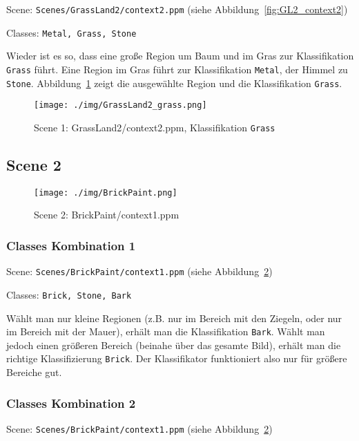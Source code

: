 Scene: \texttt{Scenes/GrassLand2/context2.ppm} (siehe Abbildung~\ref{fig:GL2_context2})

Classes: \texttt{Metal, Grass, Stone}

Wieder ist es so, dass eine große Region um Baum und im Gras zur Klassifikation \texttt{Grass} führt. Eine Region im Gras führt zur Klassifikation \texttt{Metal}, der Himmel zu \texttt{Stone}. Abbildung~\ref{fig:GL2_context2_grass} zeigt die ausgewählte Region und die Klassifikation \texttt{Grass}.

\begin{figure}[htb!]
 \centering
 \texttt{[image: ./img/GrassLand2\_grass.png]}
 \caption{Scene 1: GrassLand2/context2.ppm, Klassifikation \texttt{Grass}}
 \label{fig:GL2_context2_grass}
\end{figure}


\subsection{Scene 2}

\begin{figure}[htb!]
 \centering
 \texttt{[image: ./img/BrickPaint.png]}
 \caption{Scene 2: BrickPaint/context1.ppm}
 \label{fig:BP_context1}
\end{figure}


\subsubsection{Classes Kombination 1}

Scene: \texttt{Scenes/BrickPaint/context1.ppm} (siehe Abbildung~\ref{fig:BP_context1})

Classes: \texttt{Brick, Stone, Bark}

Wählt man nur kleine Regionen (z.B. nur im Bereich mit den Ziegeln, oder nur im Bereich mit der Mauer), erhält man die Klassifikation \texttt{Bark}. Wählt man jedoch einen größeren Bereich (beinahe über das gesamte Bild), erhält man die richtige Klassifizierung \texttt{Brick}. Der Klassifikator funktioniert also nur für größere Bereiche gut.


\subsubsection{Classes Kombination 2}

Scene: \texttt{Scenes/BrickPaint/context1.ppm} (siehe Abbildung~\ref{fig:BP_context1})


